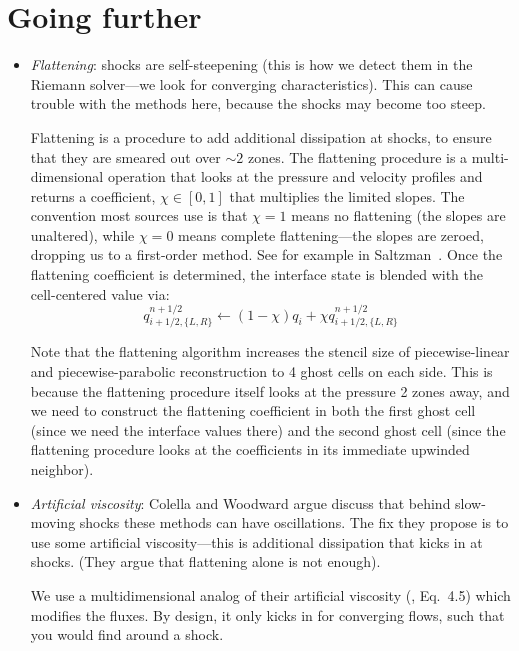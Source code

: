 \section{Going further}

\begin{itemize}

\item {\em Flattening}: shocks are self-steepening (this is how we
  detect them in the Riemann solver---we look for converging characteristics).
  This can cause trouble with the methods here, because the shocks may become
  too steep.  

  Flattening is a procedure to add additional dissipation at shocks,
  to ensure that they are smeared out over $\sim 2$ zones.  The
  flattening procedure is a multi-dimensional operation that looks at
  the pressure and velocity profiles and returns a coefficient, $\chi
  \in [0,1]$ that multiplies the limited slopes.  The convention most
  sources use is that $\chi = 1$ means no flattening (the slopes are
  unaltered), while $\chi = 0$ means complete flattening---the slopes
  are zeroed, dropping us to a first-order method.
  See for example in Saltzman~\cite{saltzman:1994}.  Once the flattening
  coefficient is determined, the interface state is blended with the
  cell-centered value via:
  \begin{equation}
  q_{i+1/2,\{L,R\}}^{n+1/2} \leftarrow (1 - \chi) q_i + \chi q_{i+1/2,\{L,R\}}^{n+1/2}
  \end{equation}

  Note that the flattening algorithm increases the stencil size of
  piecewise-linear and piecewise-parabolic reconstruction to 4 ghost cells
  on each side.  This is because the flattening procedure itself looks
  at the pressure 2 zones away, and we need to construct the flattening
  coefficient in both the first ghost cell (since we need the interface
  values there) and the second ghost cell (since the flattening procedure
  looks at the coefficients in its immediate upwinded neighbor).

\item {\em Artificial viscosity}: Colella and Woodward argue discuss
  that behind slow-moving shocks these methods can have oscillations.
  The fix they propose is to use some artificial viscosity---this is
  additional dissipation that kicks in at shocks.  (They argue that
  flattening alone is not enough).  

  We use a multidimensional analog of their artificial viscosity
  (\cite{colellawoodward:1984}, Eq.\ 4.5) which modifies the fluxes.
  By design, it only kicks in for converging flows, such that you
  would find around a shock.


\end{itemize}
